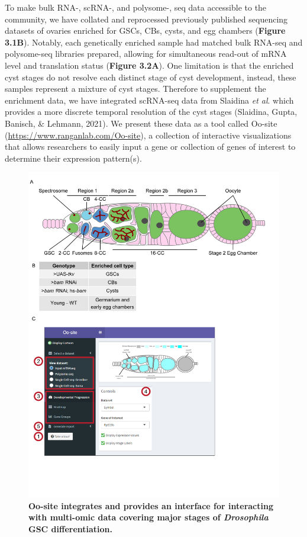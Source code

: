 \documentclass[12pt,oneside]{reedthesis}
\begin{document}
To make bulk RNA-, scRNA-, and polysome-, seq data accessible to the
community, we have collated and reprocessed previously published
sequencing datasets of ovaries enriched for GSCs, CBs, cysts, and egg
chambers (\textbf{Figure 3.1B}). Notably, each genetically enriched sample had
matched bulk RNA-seq and polysome-seq libraries prepared, allowing for
simultaneous read-out of mRNA level and translation status
(\textbf{Figure 3.2A}). One limitation is that the enriched cyst
stages do not resolve each distinct stage of cyst development, instead,
these samples represent a mixture of cyst stages. Therefore to
supplement the enrichment data, we have integrated scRNA-seq data from
Slaidina \emph{et al}. which provides a more discrete temporal resolution of
the cyst stages (Slaidina, Gupta, Banisch, \& Lehmann, 2021). We present
these data as a tool called Oo-site
(\url{https://www.ranganlab.com/Oo-site}), a collection of interactive
visualizations that allows researchers to easily input a gene or
collection of genes of interest to determine their expression
pattern(s).
\begin{figure}

{\centering \includegraphics[width=1\linewidth]{./figure/Oo_site/Figure1} 

}

\caption[\textbf{Oo-site integrates and provides an interface for interacting with multi-omic data covering major stages of \emph{Drosophila} GSC differentiation.}]{\textbf{Oo-site integrates and provides an interface for interacting with multi-omic data covering major stages of \emph{Drosophila} GSC differentiation.}}\label{fig:oosite-fig-1}
\end{figure}
\end{document}
